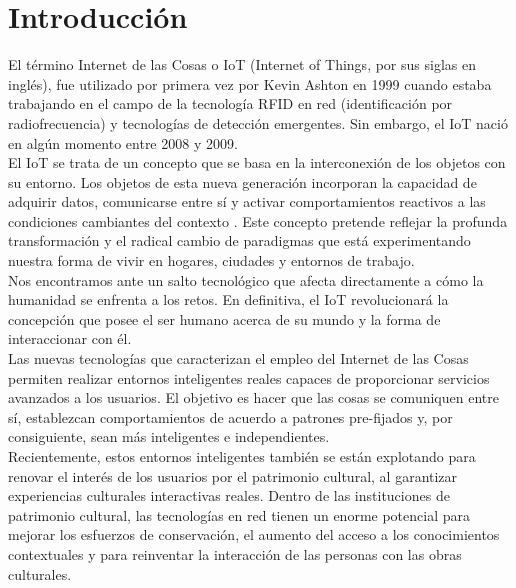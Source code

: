 \renewcommand{\thepage}{\arabic{page}}

    \section*{\LARGE Introducción}

    \setcounter{page}{1} %
    \pagestyle{plain} %

    El término Internet de las Cosas o IoT (Internet of Things, por sus siglas en inglés), fue utilizado por primera vez por Kevin Ashton en 1999 cuando estaba trabajando en el campo de la tecnología RFID en red (identificación por radiofrecuencia) y tecnologías de detección emergentes. Sin embargo, el IoT nació en algún momento entre 2008 y 2009. \cite{evolucionIoT}\\

    El IoT se trata de un concepto que se basa en la interconexión de los objetos con su entorno. Los objetos de esta nueva generación incorporan la capacidad de adquirir datos, comunicarse entre sí y activar comportamientos reactivos a las condiciones cambiantes del contexto \cite{agriculturaPrecision}. Este concepto pretende reflejar la profunda transformación y el radical cambio de paradigmas que está experimentando nuestra forma de vivir en hogares, ciudades y entornos de trabajo.\\

    Nos encontramos ante un salto tecnológico que afecta directamente a cómo la humanidad se enfrenta a los retos. En definitiva, el IoT revolucionará la concepción que posee el ser humano acerca de su mundo y la forma de interaccionar con él. \cite{revolucionDefinitiva} \\

    Las nuevas tecnologías que caracterizan el empleo del Internet de las Cosas permiten realizar entornos inteligentes reales capaces de proporcionar servicios avanzados a los usuarios. El objetivo es hacer que las cosas se comuniquen entre sí, establezcan comportamientos de acuerdo a patrones pre-fijados y, por consiguiente, sean más inteligentes e independientes.\\
    
    Recientemente, estos entornos inteligentes también se están explotando para renovar el interés de los usuarios por el patrimonio cultural, al garantizar experiencias culturales interactivas reales. Dentro de las instituciones de patrimonio cultural, las tecnologías en red tienen un enorme potencial para mejorar los esfuerzos de conservación, el aumento del acceso a los conocimientos contextuales y para reinventar la interacción de las personas con las obras culturales.\\
    
